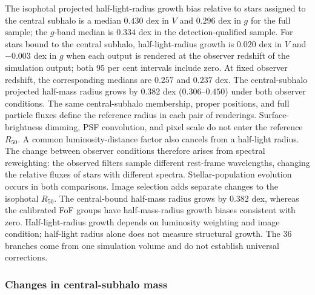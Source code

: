 \documentclass[usenatbib]{mnras}
\begin{document}
The isophotal projected half-light-radius growth bias relative to stars
assigned to the central subhalo is a median $0.430$ dex in $V$ and
$0.296$ dex in $g$ for the full sample; the $g$-band median is $0.334$
dex in the detection-qualified sample. For stars bound to the
central subhalo, half-light-radius growth is $0.020$ dex in $V$ and
$-0.003$ dex in $g$ when each output is rendered at the observer redshift of the simulation output; both 95 per cent intervals include zero. At fixed
observer redshift, the corresponding medians are $0.257$ and $0.237$
dex. The central-subhalo projected half-mass radius grows by $0.382$
dex ($0.306$--$0.450$) under both observer conditions. The same
central-subhalo membership, proper positions, and full particle fluxes
define the reference radius in each pair of renderings. Surface-brightness
dimming, PSF convolution, and pixel scale do not enter the reference
$R_{50}$. A common luminosity-distance factor also cancels from a
half-light radius. The change between observer conditions therefore
arises from spectral reweighting: the observed filters sample different
rest-frame wavelengths, changing the relative fluxes of stars with
different spectra. Stellar-population evolution occurs in both
comparisons. Image selection adds separate changes to the isophotal
$R_{50}$. The central-bound half-mass radius grows by $0.382$ dex,
whereas the calibrated FoF groups have half-mass-radius growth biases
consistent with zero. Half-light-radius growth
depends on luminosity weighting and image condition; half-light radius
alone does not measure structural growth. The 36 branches come from one
simulation volume and do not establish universal corrections.

\subsubsection{Changes in central-subhalo mass}
\end{document}
